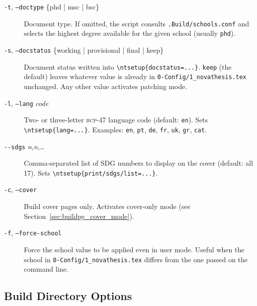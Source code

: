 \begin{description}
  \item[\texttt{-t}, \texttt{--doctype} \{\gls{phd} | \gls{msc} | \gls{bsc}\}]
        Document type.  If omitted, the script consults
        \verb!.Build/schools.conf! and selects the highest degree available
        for the given school (usually \texttt{phd}).

  \item[\texttt{-s}, \texttt{--docstatus} \{working | provisional | final | keep\}]
        Document status written into \verb!\ntsetup{docstatus=...}!.
        \texttt{keep} (the default) leaves whatever value is already in
        \verb!0-Config/1_novathesis.tex! unchanged.  Any other value
        activates patching mode.

  \item[\texttt{-l}, \texttt{--lang} \textit{code}]
        Two- or three-letter \textsc{bcp-47} language code (default:
        \texttt{en}).  Sets \verb!\ntsetup{lang=...}!.  Examples:
        \texttt{en}, \texttt{pt}, \texttt{de}, \texttt{fr}, \texttt{uk},
        \texttt{gr}, \texttt{cat}.

  \item[\texttt{-{}-sdgs} \textit{n,n,\ldots}]
        Comma-separated list of \gls{SDG} numbers to display on the cover
        (default: all 17).  Sets \verb!\ntsetup{print/sdgs/list=...}!.

  \item[\texttt{-c}, \texttt{--cover}]
        Build cover pages only.  Activates cover-only mode (see
        Section~\ref{sec:buildpy_cover_mode}).

  \item[\texttt{-f}, \texttt{--force-school}]
        Force the school value to be applied even in user mode.  Useful when
        the school in \verb!0-Config/1_novathesis.tex! differs from the one
        passed on the command line.
\end{description}

\subsection{Build Directory Options}
\label{sec:buildpy_bdir_opts}

